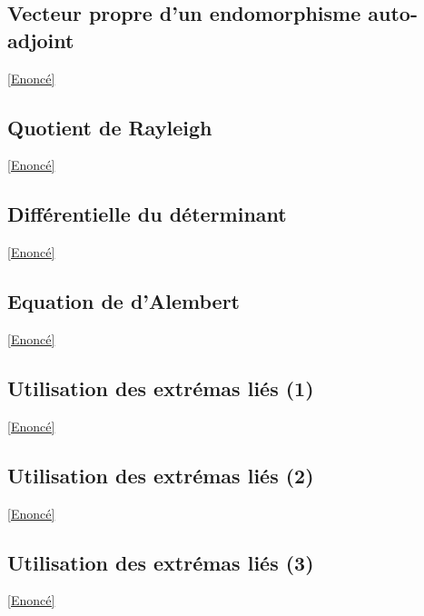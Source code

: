 \documentclass{book}
\begin{document}
	\subsection{Vecteur propre d'un endomorphisme auto-adjoint}\label{sec:vecteur-propre-dun-endomorphisme-auto-adjoint}
		\textcolor{blue}{\hyperref[Vecteur propre d'un endomorhpsime auto-adjoint]{[Enoncé]}}\\
	
	\subsection{Quotient de Rayleigh}\label{sec:quotient-de-rayleigh}
		\textcolor{blue}{\hyperref[Quotient de Rayleigh]{[Enoncé]}}\\
	
	\subsection{Différentielle du déterminant}\label{sec:differentielle-du-determinant}
		\textcolor{blue}{\hyperref[Différentielle du déterminant]{[Enoncé]}}\\
	
	\subsection{Equation de d'Alembert}\label{sec:equation-de-dalembert}
		\textcolor{blue}{\hyperref[Equation de d'Alembert]{[Enoncé]}}\\
	
	\subsection{Utilisation des extrémas liés (1)}\label{sec:utilisation-des-extremas-lies-1}
		\textcolor{blue}{\hyperref[Utilisation des extrema liés 1]{[Enoncé]}}\\
	
	\subsection{Utilisation des extrémas liés (2)}\label{sec:utilisation-des-extremas-lies-2}
		\textcolor{blue}{\hyperref[Utilisation des extrema liés 2]{[Enoncé]}}\\
	\subsection{Utilisation des extrémas liés (3)}\label{sec:utilisation-des-extremas-lies-3}
		\textcolor{blue}{\hyperref[Utilisation des extrema liés 3]{[Enoncé]}}\\
\end{document}
